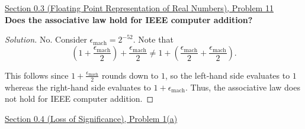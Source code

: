 \documentclass[11pt]{article}
\newenvironment{solution}
  {\renewcommand\qedsymbol{$\blacksquare$}\begin{proof}[Solution]}
  {\end{proof}}
\theoremstyle{definition}
\begin{document}
\underline{Section 0.3 (Floating Point Representation of Real Numbers), Problem 11} \\

\textbf{Does the associative law hold for IEEE computer addition?}

\begin{solution}
No. Consider $\epsilon_{\mathrm{mach}} = 2^{-52}.$ Note that
\[ \left( 1 + \frac{\epsilon_{\mathrm{mach}}}{2}\right) + \frac{\epsilon_{\mathrm{mach}}}{2} \neq 1 + \left(\frac{\epsilon_{\mathrm{mach}}}{2} + \frac{\epsilon_{\mathrm{mach}}}{2}\right).\]

This follows since $1 + \frac{\epsilon_{\mathrm{mach}}}{2}$ rounds down to $1$, so the left-hand side evaluates to $1$ whereas the right-hand side evaluates to $1 + \epsilon_{\mathrm{mach}}.$ Thus, the associative law does not hold for IEEE computer addition.
\end{solution}

\newpage

\underline{Section 0.4 (Loss of Significance), Problem 1(a)} \\
\end{document}
